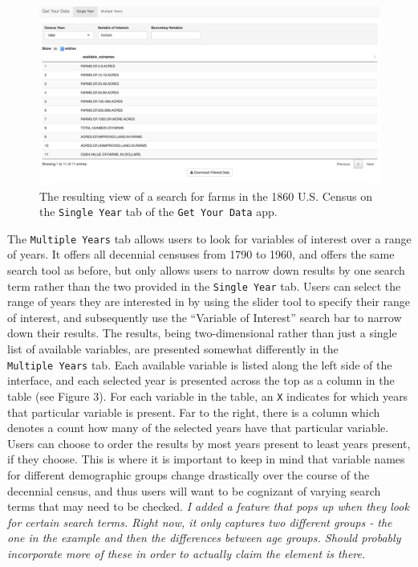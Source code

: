 \documentclass[11pt,]{article}
\begin{document}
\begin{figure}[htbp]
\centering
\includegraphics{./figures/app-sshot-farms.png}
\caption{The resulting view of a search for farms in the 1860 U.S.
Census on the \texttt{Single\ Year} tab of the \texttt{Get\ Your\ Data}
app.}
\end{figure}

The \texttt{Multiple\ Years} tab allows users to look for variables of
interest over a range of years. It offers all decennial censuses from
1790 to 1960, and offers the same search tool as before, but only allows
users to narrow down results by one search term rather than the two
provided in the \texttt{Single\ Year} tab. Users can select the range of
years they are interested in by using the slider tool to specify their
range of interest, and subsequently use the ``Variable of Interest''
search bar to narrow down their results. The results, being
two-dimensional rather than just a single list of available variables,
are presented somewhat differently in the \texttt{Multiple\ Years} tab.
Each available variable is listed along the left side of the interface,
and each selected year is presented across the top as a column in the
table (see Figure 3). For each variable in the table, an \texttt{X}
indicates for which years that particular variable is present. Far to
the right, there is a column which denotes a count how many of the
selected years have that particular variable. Users can choose to order
the results by most years present to least years present, if they
choose. This is where it is important to keep in mind that variable
names for different demographic groups change drastically over the
course of the decennial census, and thus users will want to be cognizant
of varying search terms that may need to be checked. \emph{I added a
feature that pops up when they look for certain search terms. Right now,
it only captures two different groups - the one in the example and then
the differences between age groups. Should probably incorporate more of
these in order to actually claim the element is there.}
\end{document}
